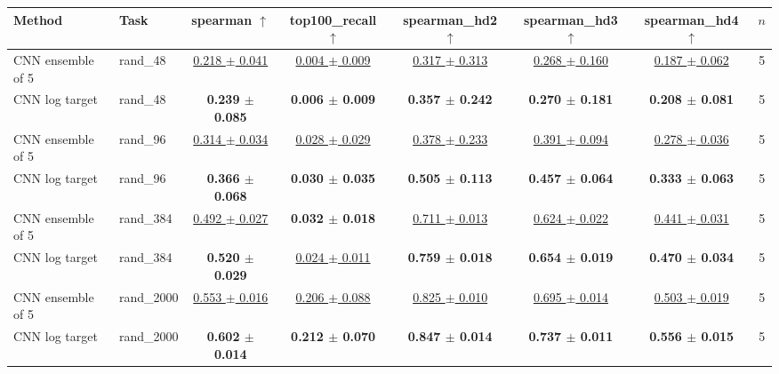 \begin{tabular}{llcccccc}
\toprule
Method & Task & spearman $\uparrow$ & top100\_recall $\uparrow$ & spearman\_hd2 $\uparrow$ & spearman\_hd3 $\uparrow$ & spearman\_hd4 $\uparrow$ & $n$ \\
\midrule
CNN ensemble of 5 & rand\_48 & \underline{0.218 $\pm$ 0.041} & \underline{0.004 $\pm$ 0.009} & \underline{0.317 $\pm$ 0.313} & \underline{0.268 $\pm$ 0.160} & \underline{0.187 $\pm$ 0.062} & 5 \\
CNN log target & rand\_48 & \textbf{0.239 $\pm$ 0.085} & \textbf{0.006 $\pm$ 0.009} & \textbf{0.357 $\pm$ 0.242} & \textbf{0.270 $\pm$ 0.181} & \textbf{0.208 $\pm$ 0.081} & 5 \\
\midrule
CNN ensemble of 5 & rand\_96 & \underline{0.314 $\pm$ 0.034} & \underline{0.028 $\pm$ 0.029} & \underline{0.378 $\pm$ 0.233} & \underline{0.391 $\pm$ 0.094} & \underline{0.278 $\pm$ 0.036} & 5 \\
CNN log target & rand\_96 & \textbf{0.366 $\pm$ 0.068} & \textbf{0.030 $\pm$ 0.035} & \textbf{0.505 $\pm$ 0.113} & \textbf{0.457 $\pm$ 0.064} & \textbf{0.333 $\pm$ 0.063} & 5 \\
\midrule
CNN ensemble of 5 & rand\_384 & \underline{0.492 $\pm$ 0.027} & \textbf{0.032 $\pm$ 0.018} & \underline{0.711 $\pm$ 0.013} & \underline{0.624 $\pm$ 0.022} & \underline{0.441 $\pm$ 0.031} & 5 \\
CNN log target & rand\_384 & \textbf{0.520 $\pm$ 0.029} & \underline{0.024 $\pm$ 0.011} & \textbf{0.759 $\pm$ 0.018} & \textbf{0.654 $\pm$ 0.019} & \textbf{0.470 $\pm$ 0.034} & 5 \\
\midrule
CNN ensemble of 5 & rand\_2000 & \underline{0.553 $\pm$ 0.016} & \underline{0.206 $\pm$ 0.088} & \underline{0.825 $\pm$ 0.010} & \underline{0.695 $\pm$ 0.014} & \underline{0.503 $\pm$ 0.019} & 5 \\
CNN log target & rand\_2000 & \textbf{0.602 $\pm$ 0.014} & \textbf{0.212 $\pm$ 0.070} & \textbf{0.847 $\pm$ 0.014} & \textbf{0.737 $\pm$ 0.011} & \textbf{0.556 $\pm$ 0.015} & 5 \\
\bottomrule
\end{tabular}
